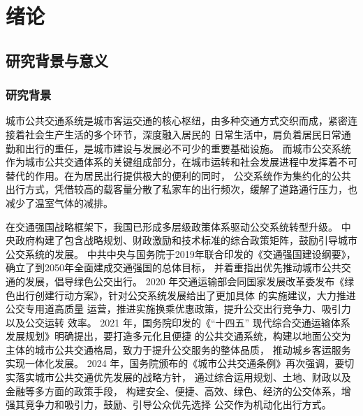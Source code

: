 \chapter{绪论}\label{第1章}

\section{研究背景与意义}

\subsection{研究背景}
城市公共交通系统是城市客运交通的核心枢纽，由多种交通方式交织而成，紧密连接着社会生产生活的多个环节，深度融入居民的
日常生活中，肩负着居民日常通勤和出行的重任，是城市建设与发展必不可少的重要基础设施。
而城市公交系统作为城市公共交通体系的关键组成部分，在城市运转和社会发展进程中发挥着不可替代的作用。在为居民出行提供极大的便利的同时，
公交系统作为集约化的公共出行方式，凭借较高的载客量分散了私家车的出行频次，缓解了道路通行压力，也减少了温室气体的减排。

在交通强国战略框架下，我国已形成多层级政策体系驱动公交系统转型升级。
中央政府构建了包含战略规划、财政激励和技术标准的综合政策矩阵，鼓励引导城市公交系统的发展。
中共中央与国务院于2019年联合印发的《交通强国建设纲要》\cite{noauthor__nodate}，确立了到2050年全面建成交通强国的总体目标，
并着重指出优先推动城市公共交通的发展，倡导绿色公交出行。
2020 年交通运输部会同国家发展改革委发布《绿色出行创建行动方案》\cite{__2020}，针对公交系统发展给出了更加具体
的实施建议，大力推进公交专用道高质量
运营，推进实施换乘优惠政策，提升公交出行竞争力、吸引力以及公交运转
效率。
2021 年，国务院印发的《“十四五” 现代综合交通运输体系发展规划》\cite{noauthor__nodate-1}明确提出，要打造多元化且便捷
的公共交通系统，构建以地面公交为主体的城市公共交通格局，致力于提升公交服务的整体品质，
推动城乡客运服务实现一体化发展。
2024 年，国务院颁布的《城市公共交通条例》\cite{_793_nodate}再次强调，要切实落实城市公共交通优先发展的战略方针，
通过综合运用规划、土地、财政以及金融等多方面的政策手段，
构建安全、便捷、高效、绿色、经济的公交体系，增强其竞争力和吸引力，鼓励、引导公众优先选择
公交作为机动化出行方式。

